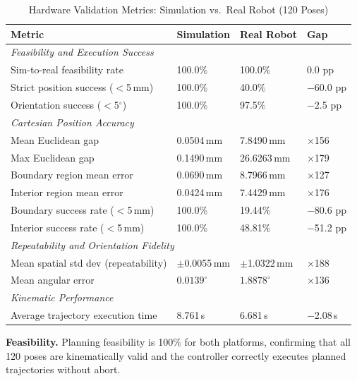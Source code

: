 \documentclass[conference]{IEEEtran}
\begin{document}
	\begin{table}[t]
		\centering
		\caption{Hardware Validation Metrics: Simulation vs.\ Real Robot (120 Poses)}
		\label{tab:hw_comparison}
		\renewcommand{\arraystretch}{1.3}
		\small
		\begin{tabular}{llll}
			\toprule
			\textbf{Metric} & \textbf{Simulation} & \textbf{Real Robot} & \textbf{Gap} \\
			\midrule
			\multicolumn{4}{l}{\textit{Feasibility and Execution Success}} \\
			Sim-to-real feasibility rate        & 100.0\%      & 100.0\%      & 0.0 pp \\
			Strict position success ($<$5\,mm)  & 100.0\%      & 40.0\%       & $-$60.0 pp \\
			Orientation success ($<$5$^\circ$)  & 100.0\%      & 97.5\%       & $-$2.5 pp \\
			\midrule
			\multicolumn{4}{l}{\textit{Cartesian Position Accuracy}} \\
			Mean Euclidean gap                  & 0.0504\,mm   & 7.8490\,mm   & $\times$156 \\
			Max Euclidean gap                   & 0.1490\,mm   & 26.6263\,mm  & $\times$179 \\
			Boundary region mean error          & 0.0690\,mm   & 8.7966\,mm   & $\times$127 \\
			Interior region mean error          & 0.0424\,mm   & 7.4429\,mm   & $\times$176 \\
			Boundary success rate ($<$5\,mm)    & 100.0\%      & 19.44\%      & $-$80.6 pp \\
			Interior success rate ($<$5\,mm)    & 100.0\%      & 48.81\%      & $-$51.2 pp \\
			\midrule
			\multicolumn{4}{l}{\textit{Repeatability and Orientation Fidelity}} \\
			Mean spatial std dev (repeatability) & $\pm$0.0055\,mm & $\pm$1.0322\,mm & $\times$188 \\
			Mean angular error                   & $0.0139^\circ$  & $1.8878^\circ$  & $\times$136 \\
			\midrule
			\multicolumn{4}{l}{\textit{Kinematic Performance}} \\
			Average trajectory execution time   & 8.761\,s     & 6.681\,s     & $-$2.08\,s \\
			\bottomrule
		\end{tabular}
	\end{table}
	
	\textbf{Feasibility.} Planning feasibility is 100\% for both
	platforms, confirming that all 120 poses are kinematically valid and
	the controller correctly executes planned trajectories without abort.
	
\end{document}

